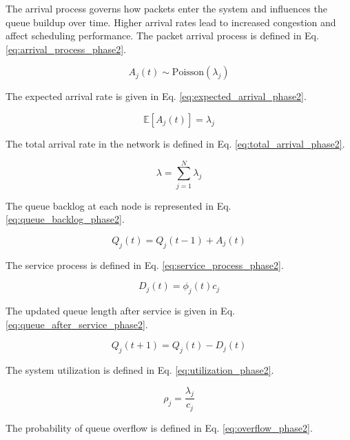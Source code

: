 \documentclass[a4paper,fleqn]{cas-dc}
\numberwithin{equation}{section}
\begin{document}
The arrival process governs how packets enter the system and influences the queue buildup over time. Higher arrival rates lead to increased congestion and affect scheduling performance. The packet arrival process is defined in Eq. \ref{eq:arrival_process_phase2}.

\begin{equation}
A_j(t) \sim \text{Poisson}(\lambda_j)
\label{eq:arrival_process_phase2}
\end{equation}

The expected arrival rate is given in Eq. \ref{eq:expected_arrival_phase2}.

\begin{equation}
\mathbb{E}[A_j(t)] = \lambda_j
\label{eq:expected_arrival_phase2}
\end{equation}

The total arrival rate in the network is defined in Eq. \ref{eq:total_arrival_phase2}.

\begin{equation}
\lambda = \sum_{j=1}^{N} \lambda_j
\label{eq:total_arrival_phase2}
\end{equation}

The queue backlog at each node is represented in Eq. \ref{eq:queue_backlog_phase2}.

\begin{equation}
Q_j(t) = Q_j(t-1) + A_j(t)
\label{eq:queue_backlog_phase2}
\end{equation}

The service process is defined in Eq. \ref{eq:service_process_phase2}.

\begin{equation}
D_j(t) = \phi_j(t)c_j
\label{eq:service_process_phase2}
\end{equation}

The updated queue length after service is given in Eq. \ref{eq:queue_after_service_phase2}.

\begin{equation}
Q_j(t+1) = Q_j(t) - D_j(t)
\label{eq:queue_after_service_phase2}
\end{equation}

The system utilization is defined in Eq. \ref{eq:utilization_phase2}.

\begin{equation}
\rho_j = \frac{\lambda_j}{c_j}
\label{eq:utilization_phase2}
\end{equation}

The probability of queue overflow is defined in Eq. \ref{eq:overflow_phase2}.
\end{document}
